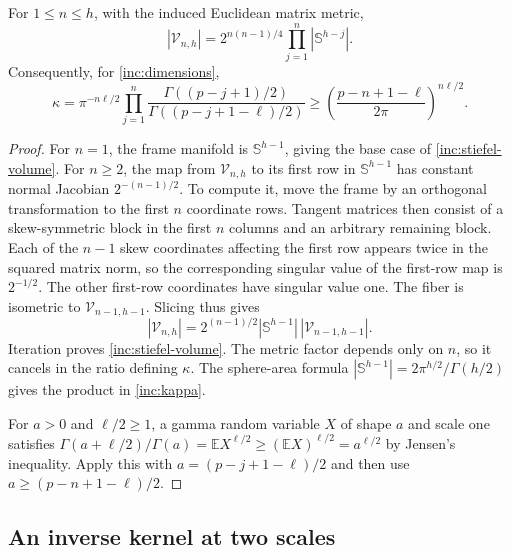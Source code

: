 \begin{lemma}\label{inc:stiefel}
For \(1\le n\le h\), with the induced Euclidean matrix metric,
\begin{equation}\label{inc:stiefel-volume}
 |\mathcal V_{n,h}|=
 2^{n(n-1)/4}\prod_{j=1}^n|\mathbb S^{h-j}|.
\end{equation}
Consequently, for \eqref{inc:dimensions},
\begin{equation}\label{inc:kappa}
 \kappa=\pi^{-n\ell/2}\prod_{j=1}^n
 \frac{\Gamma((p-j+1)/2)}{\Gamma((p-j+1-\ell)/2)}
 \ge\left(\frac{p-n+1-\ell}{2\pi}\right)^{n\ell/2}.
\end{equation}
\end{lemma}

\begin{proof}
For \(n=1\), the frame manifold is \(\mathbb S^{h-1}\), giving the base
case of \eqref{inc:stiefel-volume}.  For \(n\ge2\), the map from
\(\mathcal V_{n,h}\) to its first row in
\(\mathbb S^{h-1}\) has constant normal Jacobian
\(2^{-(n-1)/2}\).  To compute it, move the frame by an orthogonal
transformation to the first \(n\) coordinate rows.  Tangent matrices
then consist of a skew-symmetric block in the first \(n\) columns and
an arbitrary remaining block.  Each of the \(n-1\) skew coordinates
affecting the first row appears twice in the squared matrix norm, so
the corresponding singular value of the first-row map is \(2^{-1/2}\).
The other first-row coordinates have singular value one.  The fiber
is isometric to \(\mathcal V_{n-1,h-1}\).
Slicing thus gives
\[
 |\mathcal V_{n,h}|=
 2^{(n-1)/2}|\mathbb S^{h-1}|\,|\mathcal V_{n-1,h-1}|.
\]
Iteration proves \eqref{inc:stiefel-volume}.  The metric factor depends
only on \(n\), so it cancels in the ratio defining \(\kappa\).
The sphere-area formula
\(|\mathbb S^{h-1}|=2\pi^{h/2}/\Gamma(h/2)\) gives the product in
\eqref{inc:kappa}.

For \(a>0\) and \(\ell/2\ge1\), a gamma random variable \(X\) of shape
\(a\) and scale one satisfies
\(\Gamma(a+\ell/2)/\Gamma(a)=\mathbb E X^{\ell/2}
\ge(\mathbb E X)^{\ell/2}=a^{\ell/2}\) by Jensen's inequality.
Apply this with \(a=(p-j+1-\ell)/2\) and then use
\(a\ge(p-n+1-\ell)/2\).
\end{proof}

\subsection{An inverse kernel at two scales}
\label{inc:inverse-section}

